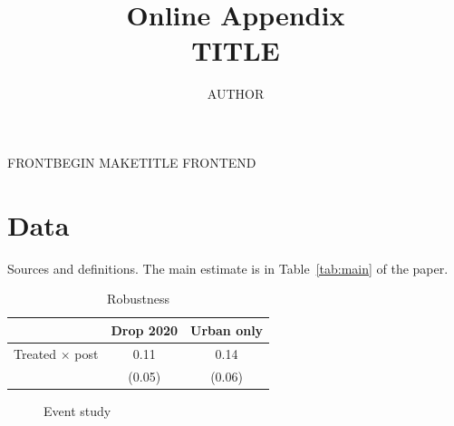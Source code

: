 \documentclass{{CLASS}}
\title{Online Appendix\\[4pt]\large {{TITLE}}}
\author{{{AUTHOR}}}
\date{}
\begin{document}
{{FRONTBEGIN}}
{{MAKETITLE}}
{{FRONTEND}}
\appendix

\section{Data}\label{app:data}
Sources and definitions. The main estimate is in Table~\ref{tab:main} of the paper.

\begin{table}[h]
  \centering
  \caption{Robustness}\label{tab:robust}
  \begin{tabular}{lcc}
    \toprule
    & Drop 2020 & Urban only \\
    \midrule
    Treated $\times$ post & 0.11 & 0.14 \\
                          & (0.05) & (0.06) \\
    \bottomrule
  \end{tabular}
\end{table}

\begin{figure}[h]
  \centering
  \caption{Event study}\label{fig:event}
\end{figure}
\end{document}
